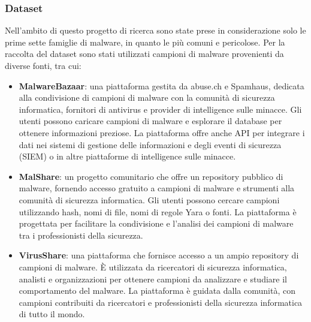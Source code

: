 \subsubsection{Dataset}
Nell'ambito di questo progetto di ricerca sono state prese in considerazione solo le prime sette famiglie di malware, in quanto le più comuni e pericolose. Per la raccolta del dataset sono stati utilizzati campioni di malware provenienti da diverse fonti, tra cui:
\begin{itemize}
    \item \textbf{MalwareBazaar}: una piattaforma gestita da abuse.ch e Spamhaus, dedicata alla condivisione di campioni di malware con la comunità di sicurezza informatica, fornitori di antivirus e provider di intelligence sulle minacce. Gli utenti possono caricare campioni di malware e esplorare il database per ottenere informazioni preziose. La piattaforma offre anche API per integrare i dati nei sistemi di gestione delle informazioni e degli eventi di sicurezza (SIEM) o in altre piattaforme di intelligence sulle minacce.
    \item \textbf{MalShare}: un progetto comunitario che offre un repository pubblico di malware, fornendo accesso gratuito a campioni di malware e strumenti alla comunità di sicurezza informatica. Gli utenti possono cercare campioni utilizzando hash, nomi di file, nomi di regole Yara o fonti. La piattaforma è progettata per facilitare la condivisione e l'analisi dei campioni di malware tra i professionisti della sicurezza.
    \item \textbf{VirusShare}: una piattaforma che fornisce accesso a un ampio repository di campioni di malware. È utilizzata da ricercatori di sicurezza informatica, analisti e organizzazioni per ottenere campioni da analizzare e studiare il comportamento del malware. La piattaforma è guidata dalla comunità, con campioni contribuiti da ricercatori e professionisti della sicurezza informatica di tutto il mondo.
\end{itemize}

